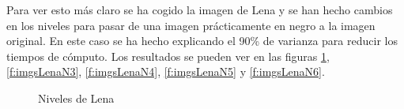 Para ver esto más claro se ha cogido la imagen de Lena y se han hecho cambios en los niveles para pasar de una imagen prácticamente en negro a la imagen original. En este caso se ha hecho explicando el 90\% de varianza para reducir los tiempos de cómputo. Los resultados se pueden ver en las figuras \ref{f:imgsLenaN2}, \ref{f:imgsLenaN3}, \ref{f:imgsLenaN4}, \ref{f:imgsLenaN5} y \ref{f:imgsLenaN6}.\\

\begin{figure}
 \centering
 \caption{Niveles de Lena}
 \label{f:imgsLenaN2}
\end{figure}

